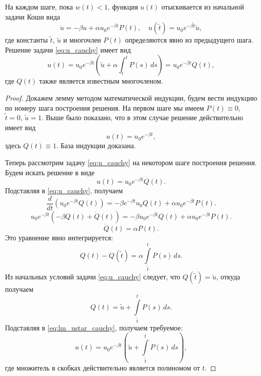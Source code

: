 \begin{lemma}
	\label{lm:u_star}
	На каждом шаге, пока $w(t) < 1$, функция $u(t)$ отыскивается из начальной задачи Коши вида 
	\begin{equation}
		\label{eq:u_cauchy}
		\dot{u}=-\beta u + \alpha u_0 e^{-\beta t} P(t),\quad u(\tilde{t})=u_0 e^{-\beta \tilde{t}}\tilde{u},
	\end{equation}
	где константы $\tilde{t}$, $\tilde{u}$ и многочлен $P(t)$ определяются явно из предыдущего шага.
	Решение задачи \eqref{eq:u_cauchy} имеет вид
	\begin{equation}
		\label{eq:u_cauchy_sol}
		u(t) = u_0 e^{-\beta t}(\tilde{u}+\alpha \int_{\tilde{t}}^{t} P(s)\,ds) = u_0 e^{-\beta t} Q(t),
	\end{equation}
	где $Q(t)$ также является известным многочленом.
\end{lemma}

\begin{proof}
	Докажем лемму методом математической индукции, будем вести индукцию по номеру шага построения решения. На первом шаге мы имеем $P(t) \equiv 0$, $\tilde{t} = 0$, $\tilde u = 1$. Выше было показано, что в этом случае решение действительно имеет вид
	\begin{equation*}
		u(t) = u_0 e^{-\beta t},
	\end{equation*}
	здесь $Q(t) \equiv 1$. База индукции доказана.
	
	Теперь рассмотрим задачу \eqref{eq:u_cauchy} на некотором шаге построения решения. Будем искать решение в виде
	\begin{equation}
		\label{eq:lm_ustar_cauchy}
		u(t) = u_0 e^{-\beta t} Q(t).
	\end{equation}
	Подставляя в \eqref{eq:u_cauchy}, получаем
	\begin{equation*}
		\frac{d}{dt}\left(u_0 e^{-\beta t} Q(t)\right) = -\beta e^{-\beta t} u_0 Q(t) + \alpha u_0 e^{-\beta t} P(t). 
	\end{equation*}
	\begin{equation*}
		u_0 e^{-\beta t} (-\beta Q(t) + \dot{Q}(t)) = -\beta u_0 e^{-\beta t} Q(t) + \alpha u_0 e^{-\beta t} P(t).
	\end{equation*}
	\begin{equation*}
		\dot{Q}(t) = \alpha P(t).
	\end{equation*}
	Это уравнение явно интегрируется:
	\begin{equation*}
		Q(t) - Q(\tilde{t}) = \alpha \int\limits_{\tilde{t}}^t P(s)\,ds.
	\end{equation*}
	Из начальных условий задачи \eqref{eq:u_cauchy} следует, что $Q(\tilde{t}) = \tilde{u}$, откуда получаем
	\begin{equation*}
		Q(t) = \tilde{u} + \int\limits_{\tilde{t}}^t P(s)\,ds.
	\end{equation*}
	Подставляя в \eqref{eq:lm_ustar_cauchy}, получаем требуемое:
	\begin{equation*}
		u(t) = u_0 e^{-\beta t} \left(\tilde{u} + \int\limits_{\tilde{t}}^t P(s)\,ds\right),
	\end{equation*}
	где множитель в скобках действительно является полиномом от $t$.
\end{proof}

